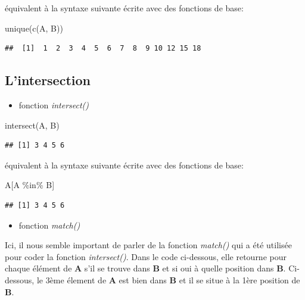 \documentclass[
]{book}
\newenvironment{Shaded}{\begin{snugshade}}{\end{snugshade}}
\newcommand{\FunctionTok}[1]{\textcolor[rgb]{0.00,0.00,0.00}{#1}}
\newcommand{\NormalTok}[1]{#1}
\newcommand{\SpecialCharTok}[1]{\textcolor[rgb]{0.00,0.00,0.00}{#1}}
\providecommand{\tightlist}{%
  \setlength{\itemsep}{0pt}\setlength{\parskip}{0pt}}
\theoremstyle{definition}
\theoremstyle{definition}
\theoremstyle{definition}
\theoremstyle{definition}
\theoremstyle{remark}
\begin{document}
équivalent à la syntaxe suivante écrite avec des fonctions de base:

\begin{Shaded}
\begin{Highlighting}[]
\FunctionTok{unique}\NormalTok{(}\FunctionTok{c}\NormalTok{(A, B))}
\end{Highlighting}
\end{Shaded}

\begin{verbatim}
##  [1]  1  2  3  4  5  6  7  8  9 10 12 15 18
\end{verbatim}

\hypertarget{lintersection}{%
\subsection{L'intersection}\label{lintersection}}

\begin{itemize}
\tightlist
\item
  fonction \emph{intersect()}
\end{itemize}

\begin{Shaded}
\begin{Highlighting}[]
\FunctionTok{intersect}\NormalTok{(A, B)}
\end{Highlighting}
\end{Shaded}

\begin{verbatim}
## [1] 3 4 5 6
\end{verbatim}

équivalent à la syntaxe suivante écrite avec des fonctions de base:

\begin{Shaded}
\begin{Highlighting}[]
\NormalTok{A[A }\SpecialCharTok{\%in\%}\NormalTok{ B]}
\end{Highlighting}
\end{Shaded}

\begin{verbatim}
## [1] 3 4 5 6
\end{verbatim}

\begin{itemize}
\tightlist
\item
  fonction \emph{match()}
\end{itemize}

Ici, il nous semble important de parler de la fonction \emph{match()} qui a été utilisée pour coder la fonction \emph{intersect()}. Dans le code ci-dessous, elle retourne pour chaque élément de \textbf{A} s'il se trouve dans \textbf{B} et si oui à quelle position dans \textbf{B}. Ci-dessous, le 3ème élement de \textbf{A} est bien dans \textbf{B} et il se situe à la 1ère position de \textbf{B}.
\end{document}
